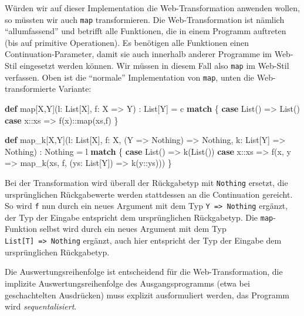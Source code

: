 \documentclass[]{article}
\newenvironment{Shaded}{}{}
\newcommand{\FunctionTok}[1]{\textcolor[rgb]{0.02,0.16,0.49}{#1}}
\newcommand{\KeywordTok}[1]{\textcolor[rgb]{0.00,0.44,0.13}{\textbf{#1}}}
\newcommand{\NormalTok}[1]{#1}
\begin{document}
Würden wir auf dieser Implementation die Web-Transformation anwenden
wollen, so müssten wir auch \texttt{map} transformieren. Die
Web-Transformation ist nämlich ``allumfassend'' und betrifft alle
Funktionen, die in einem Programm auftreten (bis auf primitive
Operationen). Es benötigen alle Funktionen einen Continuation-Parameter,
damit sie auch innerhalb anderer Programme im Web-Stil eingesetzt werden
können. Wir müssen in diesem Fall also \texttt{map} im Web-Stil
verfassen. Oben ist die ``normale'' Implementation von \texttt{map},
unten die Web-transformierte Variante:

\begin{Shaded}
\begin{Highlighting}[]
\KeywordTok{def}\NormalTok{ map[X,Y](l: List[X], f: X =\textgreater{} Y) : List[Y] = c }\KeywordTok{match}\NormalTok{ \{}
  \KeywordTok{case}\NormalTok{ List() =\textgreater{} List()}
  \KeywordTok{case}\NormalTok{ x::xs =\textgreater{} }\FunctionTok{f}\NormalTok{(x)::}\FunctionTok{map}\NormalTok{(xs,f)}
\NormalTok{\}}

\KeywordTok{def}\NormalTok{ map\_k[X,Y](l: List[X],}
\NormalTok{               f: X, (Y =\textgreater{} Nothing) =\textgreater{} Nothing,}
\NormalTok{               k: List[Y] =\textgreater{} Nothing) : Nothing = l }\KeywordTok{match}\NormalTok{ \{}
  \KeywordTok{case}\NormalTok{ List() =\textgreater{} }\FunctionTok{k}\NormalTok{(List())}
  \KeywordTok{case}\NormalTok{ x::xs =\textgreater{} }\FunctionTok{f}\NormalTok{(x, y =\textgreater{} }\FunctionTok{map\_k}\NormalTok{(xs, f, (ys: List[Y]) =\textgreater{} }\FunctionTok{k}\NormalTok{(y::ys)))}
\NormalTok{\}}
\end{Highlighting}
\end{Shaded}

Bei der Transformation wird überall der Rückgabetyp mit \texttt{Nothing}
ersetzt, die ursprünglichen Rückgabewerte werden stattdessen an die
Continuation gereicht. So wird \texttt{f} nun durch ein neues Argument
mit dem Typ \texttt{Y\ =\textgreater{}\ Nothing} ergänzt, der Typ der
Eingabe entspricht dem ursprünglichen Rückgabetyp. Die
\texttt{map}-Funktion selbst wird durch ein neues Argument mit dem Typ
\texttt{List{[}T{]}\ =\textgreater{}\ Nothing} ergänzt, auch hier
entspricht der Typ der Eingabe dem ursprünglichen Rückgabetyp.

Die Auswertungsreihenfolge ist entscheidend für die Web-Transformation,
die implizite Auswertungsreihenfolge des Ausgangsprogramms (etwa bei
geschachtelten Ausdrücken) muss explizit ausformuliert werden, das
Programm wird \emph{sequentalisiert}.
\end{document}
